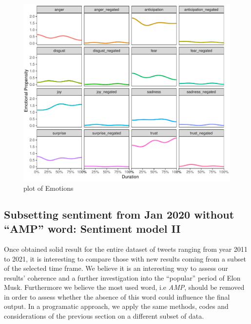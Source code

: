 \documentclass[
]{article}
\begin{document}
\begin{figure}
\centering
\includegraphics{Trial1_files/figure-latex/fig8-1.pdf}
\caption{\label{fig:fig8}plot of Emotions}
\end{figure}

\hypertarget{subsetting-sentiment-from-jan-2020-without-amp-word-sentiment-model-ii}{%
\subsection{Subsetting sentiment from Jan 2020 without ``AMP'' word:
Sentiment model
II}\label{subsetting-sentiment-from-jan-2020-without-amp-word-sentiment-model-ii}}

Once obtained solid result for the entire dataset of tweets ranging from
year 2011 to 2021, it is interesting to compare those with new results
coming from a subset of the selected time frame. We believe it is an
interesting way to assess our results' coherence and a further
investigation into the ``popular'' period of Elon Musk. Furthermore we
believe the most used word, i.e \emph{AMP}, should be removed in order
to assess whether the absence of this word could influence the final
output. In a programatic approach, we apply the same methods, codes and
considerations of the previous section on a different subset of data.
\end{document}
